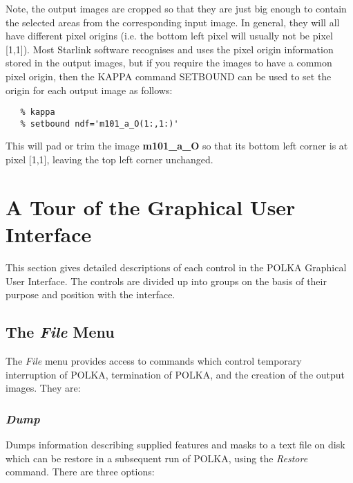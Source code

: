 \documentclass[11pt]{article}
\newcommand{\htmlref}[2]{#1}
\newcommand{\xref}[3]{#1}
\newcommand{\xlabel}[1]{}
\newcommand{\mylabel}[1] {\xlabel{#1}\label{#1}}
\begin{document}
Note, the output images are cropped so that they are just big enough to
contain the selected areas from the corresponding input image. In
general, they will all have different pixel origins (i.e. the bottom left
pixel will usually not be pixel [1,1]). Most Starlink software recognises
and uses the pixel origin information stored in the output images, but if
you require the images to have a common pixel origin, then the
\xref{KAPPA}{sun95}{} command \xref{SETBOUND}{sun95}{SETBOUND}
can be used to set the origin for each output image as follows:

\begin{verbatim}
   % kappa
   % setbound ndf='m101_a_O(1:,1:)'
\end{verbatim}

This will pad or trim the image {\bf m101\_a\_O} so that its bottom left
corner is at pixel [1,1], leaving the top left corner unchanged.

\section {\mylabel{POLKA_CONTROLS}A Tour of the Graphical User Interface}
This section gives detailed descriptions of each control in the POLKA
Graphical User Interface. The controls are divided up into groups on the
basis of their purpose and position with the interface.

\subsection {\mylabel{POLKA_FILE_MENU}The \emph{File} Menu}
The \emph{File} menu provides access to commands which control
temporary interruption of POLKA,
termination of POLKA, and the creation of the output images. They are:

\subsubsection {\mylabel{POLKA_DUMP}\emph{Dump}}
Dumps information describing supplied features and masks to a text file
on disk which can be restore in a subsequent run of POLKA, using the
\htmlref{\emph{Restore}}{POLKA_RESTORE} command. There are three
options:
\end{document}
